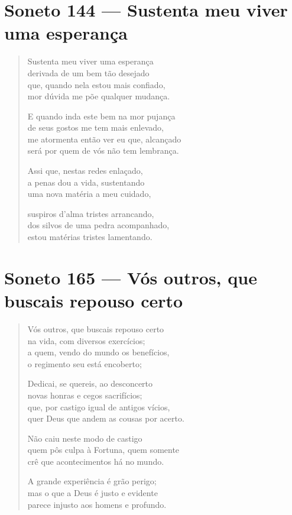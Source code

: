 \documentclass[10pt,a5paper,oneside]{book}
\begin{document}
\chapter{Soneto 144 --- Sustenta meu viver uma esperança}

\begin{verse}
Sustenta meu viver uma esperança\\
derivada de um bem tão desejado\\
que, quando nela estou mais confiado,\\
mor dúvida me põe qualquer mudança.

E quando inda este bem na mor pujança\\
de seus gostos me tem mais enlevado,\\
me atormenta então ver eu que, alcançado\\
será por quem de vós não tem lembrança.

Assi que, nestas redes enlaçado,\\
a penas dou a vida, sustentando\\
uma nova matéria a meu cuidado,

suspiros d'alma tristes arrancando,\\
dos silvos de uma pedra acompanhado,\\
estou matérias tristes lamentando.
\end{verse}

\chapter{Soneto 165 --- Vós outros, que buscais repouso certo}

\begin{verse}
Vós outros, que buscais repouso certo\\
na vida, com diversos exercícios;\\
a quem, vendo do mundo os benefícios,\\
o regimento seu está encoberto;

Dedicai, se quereis, ao desconcerto\\
novas honras e cegos sacrifícios;\\
que, por castigo igual de antigos vícios,\\
quer Deus que andem as cousas por acerto.

Não caiu neste modo de castigo\\
quem pôs culpa à Fortuna, quem somente\\
crê que acontecimentos há no mundo.

A grande experiência é grão perigo;\\
mas o que a Deus é justo e evidente\\
parece injusto aos homens e profundo.
\end{verse}
\end{document}
